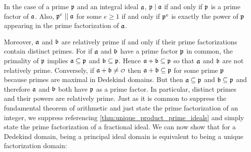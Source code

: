     \begin{remark}
      In the case of a prime $\mathfrak{p}$ and an integral ideal $\mathfrak{a}$, $\mathfrak{p} \mid \mathfrak{a}$ if and only if $\mathfrak{p}$ is a prime factor of $\mathfrak{a}$. Also, $\mathfrak{p}^{e} \mid\mid \mathfrak{a}$ for some $e \ge 1$ if and only if $\mathfrak{p}^{e}$ is exactly the power of $\mathfrak{p}$ appearing in the prime factorization of $\mathfrak{a}$.
    \end{remark}
  
     Moreover, $\mathfrak{a}$ and $\mathfrak{b}$ are relatively prime if and only if their prime factorizations contain distinct primes. For if $\mathfrak{a}$ and $\mathfrak{b}$ have a prime factor $\mathfrak{p}$ in common, the primality of $\mathfrak{p}$ implies $\mathfrak{a} \subseteq \mathfrak{p}$ and $\mathfrak{b} \subseteq \mathfrak{p}$. Hence $\mathfrak{a}+\mathfrak{b} \subseteq \mathfrak{p}$ so that $\mathfrak{a}$ and $\mathfrak{b}$ are not relatively prime. Conversely, if $\mf{a}+\mf{b} \neq \smc{O}$ then $\mathfrak{a}+\mathfrak{b} \subseteq \mathfrak{p}$ for some prime $\mathfrak{p}$ because primes are maximal in Dedekind domains. But then $\mathfrak{a} \subseteq \mathfrak{p}$ and $\mathfrak{b} \subseteq \mathfrak{p}$ and therefore $\mathfrak{a}$ and $\mathfrak{b}$ both have $\mathfrak{p}$ as a prime factor. In particular, distinct primes and their powers are relatively prime. Just as it is common to suppress the fundamental theorem of arithmetic and just state the prime factorization of an integer, we suppress referencing \cref{thm:unique_product_prime_ideals} and simply state the prime factorization of a fractional ideal. We can now show that for a Dedekind domain, being a principal ideal domain is equivalent to being a unique factorization domain:

